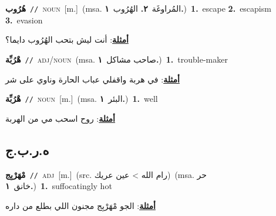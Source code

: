 \documentclass[10pt,a4paper,twoside]{article} %
\begin{document}
\begin{multicols}{2}
{\setlength\topsep{0pt}\textbf{\foreignlanguage{arabic}{هُرُوب}}\ {\color{gray}\texttt{//}\color{black}}\ \textsc{noun}\ [m.]\ \color{gray}(msa. \foreignlanguage{arabic}{المُراوغَة}~\foreignlanguage{arabic}{\textbf{٢.}}  \foreignlanguage{arabic}{الهُرُوب}~\foreignlanguage{arabic}{\textbf{١.}})\color{black}\ \textbf{1.}~escape  \textbf{2.}~escapism  \textbf{3.}~evasion\  \begin{flushright}\color{gray}\foreignlanguage{arabic}{\textbf{\underline{\foreignlanguage{arabic}{أمثلة}}}: أنت ليش بتحب الهُرُوب دايما؟}\end{flushright}\color{black}} \vspace{2mm}

{\setlength\topsep{0pt}\textbf{\foreignlanguage{arabic}{هْرُبِّة}}\ {\color{gray}\texttt{//}\color{black}}\ \textsc{adj/noun}\ \color{gray}(msa. \foreignlanguage{arabic}{صاحب مشاكل}~\foreignlanguage{arabic}{\textbf{١.}})\color{black}\ \textbf{1.}~trouble-maker\  \begin{flushright}\color{gray}\foreignlanguage{arabic}{\textbf{\underline{\foreignlanguage{arabic}{أمثلة}}}: في هربة واقفلي عباب الحارة وناوي على شر}\end{flushright}\color{black}} \vspace{2mm}

{\setlength\topsep{0pt}\textbf{\foreignlanguage{arabic}{هْرُبِّة}}\ {\color{gray}\texttt{//}\color{black}}\ \textsc{noun}\ [m.]\ \color{gray}(msa. \foreignlanguage{arabic}{البئر}~\foreignlanguage{arabic}{\textbf{١.}})\color{black}\ \textbf{1.}~well\  \begin{flushright}\color{gray}\foreignlanguage{arabic}{\textbf{\underline{\foreignlanguage{arabic}{أمثلة}}}: روح اسحب مي من الهربة}\end{flushright}\color{black}} \vspace{2mm}

\vspace{-3mm}
\subsection*{\color{blue}\foreignlanguage{arabic}{ه.ر.ب.ج}\color{blue}{}} 

{\setlength\topsep{0pt}\textbf{\foreignlanguage{arabic}{مْهَرْبِج}}\ {\color{gray}\texttt{//}\color{black}}\ \textsc{adj}\ [m.]\ (src. \color{gray}\foreignlanguage{arabic}{رام الله > عين عريك}\color{black})\ \color{gray}(msa. \foreignlanguage{arabic}{حر خانق}~\foreignlanguage{arabic}{\textbf{١.}})\color{black}\ \textbf{1.}~suffocatingly hot\  \begin{flushright}\color{gray}\foreignlanguage{arabic}{\textbf{\underline{\foreignlanguage{arabic}{أمثلة}}}: الجو مْهَرْبِج مجنون اللي بطلع من داره}\end{flushright}\color{black}} \vspace{2mm}


\end{multicols}
\end{document}
